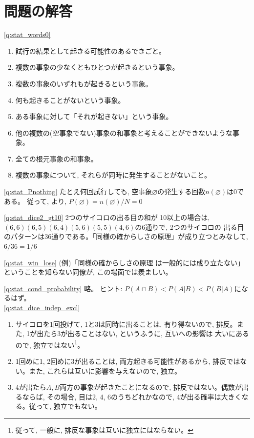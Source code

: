\section*{問題の解答}

%
\ref{q:stat_words0} 
\begin{enumerate}
\item 試行の結果として起きる可能性のあるできごと。
\item 複数の事象の少なくともひとつが起きるという事象。
\item 複数の事象のいずれもが起きるという事象。
\item 何も起きることがないという事象。
\item ある事象に対して「それが起きない」という事象。
\item 他の複数の(空事象でない)事象の和事象と考えることができないような事象。
\item 全ての根元事象の和事象。
\item 複数の事象について, それらが同時に発生することがないこと。
\end{enumerate}
\mv

%
\ref{q:stat_Pnothing}  たとえ何回試行しても, 空事象$\varnothing$の発生する回数$n(\varnothing)$は0である。
従って, より, $P(\varnothing)=n(\varnothing)/N=0$
\mv

%
\ref{q:stat_dice2_gt10} 2つのサイコロの出る目の和が
10以上の場合は, $(6,6)(6,5)(6,4)(5,6)(5,5)(4,6)$の6通りで, 2つのサイコロの
出る目のパターンは36通りである。「同様の確からしさの原理」が成り立つとみなして, 
$6/36=1/6$
\mv

\ref{q:stat_win_lose} (例)「同様の確からしさの原理
は一般的には成り立たない」ということを知らない同僚が, この場面では羨ましい。
\mv

\ref{q:stat_cond_probability} 略。
ヒント: $P(A\cap B) < P(A|B) < P(B|A)$になるはず。\\


%
\ref{q:stat_dice_indep_excl} 
\begin{enumerate}
\item サイコロを1回投げて, 1と3は同時に出ることは, 有り得ないので, 排反。また, 1が出たら3が出ることはない, というふうに, 互いへの影響は
大いにあるので, 独立ではない\footnote{従って, 一般に, 排反な事象は互いに独立にはならない。}。
\item 1回めに1, 2回めに3が出ることは, 両方起きる可能性があるから, 排反ではない。また, これらは互いに影響を与えないので, 独立。
\item 4が出たら$A, B$両方の事象が起きたことになるので, 排反ではない。偶数が出るならば, その場合, 目は2, 4, 6のうちどれかなので, 
4が出る確率は大きくなる。従って, 独立でもない。
\end{enumerate}
\mv

